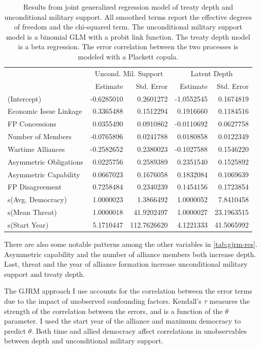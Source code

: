 \documentclass[12pt]{article}
\begin{document}
\begin{table}[ht]
\centering
\begin{tabular}{lrrrr}
  & \multicolumn{2}{c}{Uncond. Mil. Support} & \multicolumn{2}{c}{Latent Depth} \\ 
 & Estimate & Std. Error & Estimate & Std. Error \\ 
  \hline
(Intercept) & -0.6285010 & 0.2601272 & -1.0552545 & 0.1674819 \\ 
  Economic Issue Linkage & 0.3365488 & 0.1512294 & 0.1916660 & 0.1184516 \\ 
  FP Concessions & 0.0355490 & 0.0910862 & -0.0110692 & 0.0627758 \\ 
  Number of Members & -0.0765896 & 0.0241788 & 0.0180858 & 0.0122349 \\ 
  Wartime Alliances & -0.2582652 & 0.2380023 & -0.1027588 & 0.1546220 \\ 
  Asymmetric Obligations & 0.0225756 & 0.2589389 & 0.2351540 & 0.1525892 \\ 
  Asymmetric Capability & 0.0667023 & 0.1676058 & 0.1832084 & 0.1069639 \\ 
  FP Disagreement & 0.7258484 & 0.2340239 & 0.1454156 & 0.1723854 \\ 
  s(Avg. Democracy) & 1.0000023 & 1.3866492 & 1.0000052 & 7.8410458 \\ 
  s(Mean Threat) & 1.0000018 & 41.9202497 & 1.0000027 & 23.1963515 \\ 
  s(Start Year) & 5.1710447 & 112.7626620 & 4.1221333 & 41.5065992 \\ 
   \hline
\end{tabular}
\caption{Results from joint generalized regression model of treaty depth and unconditional military support. 
                     All smoothed terms report the effective degrees of freedom and the chi-squared term. 
                     The unconditional military support model is a binomial GLM with a probit link function. 
                     The treaty depth model is a beta regression. 
                     The error correlation between the two processes is modeled with a Plackett copula.} 
\label{tab:gjrm-res}
\end{table}


There are also some notable patterns among the other variables in \autoref{tab:gjrm-res}. 
Asymmetric capability and the number of alliance members both increase depth. 
Last, threat and the year of alliance formation increase unconditional military support and treaty depth. 


The GJRM approach I use accounts for the correlation between the error terms due to the impact of unobserved confounding factors. 
Kendall's $\tau$ measures the strength of the correlation between the errors, and is a function of the $\theta$ parameter.
I used the start year of the alliance and maximum democracy to predict $\theta$. 
Both time and allied democracy affect correlations in unobservables between depth and unconditional military support. 
\end{document}
